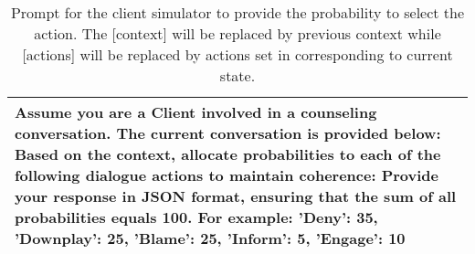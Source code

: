 \begin{table*}[tb]
\begin{tabularx}{\textwidth}{X}
\toprule
{\sf \footnotesize Assume you are a Client involved in a counseling conversation. The current conversation is provided below: \newline [context] \newline \newline Based on the context, allocate probabilities to each of the following dialogue actions to maintain coherence:  \newline [actions] \newline Provide your response in JSON format, ensuring that the sum of all probabilities equals 100. For example: {'Deny': 35, 'Downplay': 25, 'Blame': 25, 'Inform': 5, 'Engage': 10}}
\\ \bottomrule
\end{tabularx}
\caption{Prompt for the client simulator to provide the probability to select the action. The [context] will be replaced by previous context while [actions] will be replaced by actions set in corresponding to current state.}
\label{tab:action selection}
\end{table*}

